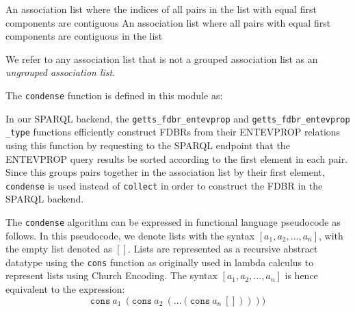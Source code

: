 \documentclass[../main.tex]{subfiles}
\begin{document}
\label{subsubsection:condense}
\begin{definition}
	An association list where the indices of all pairs in the list with equal first components are contiguous
	An association list where all pairs with equal first components are contiguous in the list
\end{definition}

We refer to any association list that is not a grouped association list as an {\em ungrouped association list}.

The \texttt{condense} function is defined in this module as:


In our SPARQL backend, the \texttt{getts\_fdbr\_entevprop} and \texttt{getts\_fdbr\_entevprop\\\_type} functions efficiently construct FDBRs from their ENTEVPROP relations using this function by requesting to the SPARQL endpoint that the ENTEVPROP query results be sorted according to the first element in each pair.  Since this groups pairs together in the association list by their first element, \texttt{condense} is used instead of \texttt{collect} in order to construct the FDBR in the SPARQL backend.

The \texttt{condense} algorithm can be expressed in functional language pseudocode as follows.
In this pseudocode, we denote lists with the syntax $[a_1, a_2, \dots, a_n]$, with the empty list
denoted as $[]$.  Lists are represented as a recursive abstract datatype using the \texttt{cons} function as originally used in lambda calculus
to represent lists using Church Encoding\cite{jansen2013programming}.  The syntax $[a_1, a_2, \dots, a_n]$ is hence equivalent to the expression: \[ \mathtt{cons}\ a_1\ (\mathtt{cons}\ a_2\ (\dots (\mathtt{cons}\ a_n\ [])))) \]
\end{document}
